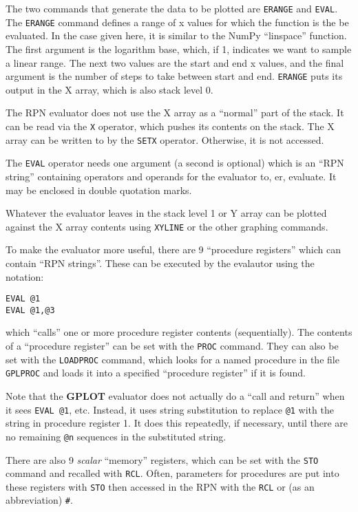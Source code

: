 \documentclass[a4paper,twoside,11pt]{article}
\newcommand{\newpara}{\par\vspace{4mm}\noindent}
\begin{document}
\newpara
The two commands that generate the data to be plotted are
\texttt{ERANGE} and \texttt{EVAL}. The \texttt{ERANGE} command defines a
range of x values for which the function is the be evaluated. In the
case given here, it is similar to the NumPy ``linspace'' function. The
first argument is the logarithm base, which, if 1, indicates we want to
sample a linear range. The next two values are the start and end x
values, and the final argument is the number of steps to take between
start and end. \texttt{ERANGE} puts its output in the X array, which is
also stack level 0.

\newpara
The RPN evaluator does not use the X array as a ``normal'' part of the
stack. It can be read via the \texttt{X} operator, which pushes its
contents on the stack. The X array can be written to by the
\texttt{SETX} operator. Otherwise, it is not accessed.

\newpara
The \texttt{EVAL} operator needs one argument (a second is optional)
which is an ``RPN string'' containing operators and operands for the
evaluator to, er, evaluate. It may be enclosed in double quotation
marks.

\newpara
Whatever the evaluator leaves in the stack level 1 or Y array can be
plotted against the X array contents using \texttt{XYLINE} or the other
graphing commands.

\newpara
To make the evaluator more useful, there are 9 ``procedure registers''
which can contain ``RPN strings''. These can be executed by the
evalautor using the notation:

\begin{lstlisting}
EVAL @1
EVAL @1,@3
\end{lstlisting}

\newpara
which ``calls'' one or more procedure register contents (sequentially).
The contents of a ``procedure register'' can be set with the
\texttt{PROC} command. They can also be set with the \texttt{LOADPROC}
command, which looks for a named procedure in the file \texttt{GPLPROC}
and loads it into a specified ``procedure register'' if it is found.

\newpara
Note that the \textbf{GPLOT} evaluator does not actually do a ``call and return''
when it sees \texttt{EVAL\ @1}, etc. Instead, it uses string
substitution to replace \texttt{@1} with the string in procedure
register 1. It does this repeatedly, if necessary, until there are no
remaining \texttt{@n} sequences in the substituted string.

\newpara
There are also 9 \emph{scalar} ``memory'' registers, which can be set
with the \texttt{STO} command and recalled with \texttt{RCL}. Often,
parameters for procedures are put into these registers with \texttt{STO}
then accessed in the RPN with the \texttt{RCL} or (as an abbreviation)
\texttt{\#}.
\end{document}

